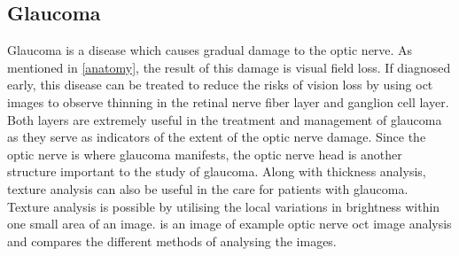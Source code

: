 \subsection{Glaucoma}
Glaucoma is a disease which causes gradual damage to the optic
nerve.  As mentioned in \cref{anatomy}, the result of this damage is visual
field loss.\cite{mbib_6} If diagnosed early, this disease can be treated to
reduce the risks of vision loss by using \Gls{oct} images to observe thinning in
the retinal nerve fiber layer and ganglion cell layer.  Both layers are extremely
useful in the treatment and management of glaucoma as they serve as
indicators of the extent of the optic nerve damage.\cite{mbib_4}
Since the optic nerve is where glaucoma manifests, the optic nerve head 
is another structure important to the study of glaucoma. \cite{mbib_4}
Along with thickness analysis, texture analysis can also be useful in the 
care for patients with glaucoma. Texture analysis is possible by utilising 
the local variations in brightness within one small area of an image.
\cite{mbib_12}  is an image of example optic nerve 
\Gls{oct} image analysis and compares the different methods of analysing 
the images.

